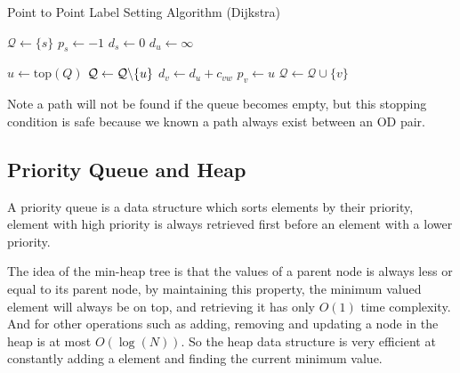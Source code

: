 \begin{algorithm}
    \caption{Point to Point Label Setting Algorithm (Dijkstra)}
    \label{algo:p2pdijkstra}
    \begin{algorithmic}[1]
        \State $\mathcal{Q} \gets \{s\}$ 
        \State $p_s \gets -1$
        \State $d_s \gets 0$
         
        \State $d_u \gets \infty$
    \EndFor

    \State $ u \gets \text{top}(Q) $
    \State $ \mathcal{Q} \gets \mathcal{Q} \char`\\ \{u\} $
    \State {}
\EndIf
{}
 
\State $d_v \gets d_u + c_{vw}$
\State $p_v \gets u$
\State $\mathcal{Q} \gets \mathcal{Q} \cup \{v\}$
                    \EndIf
                \EndFor
            \EndIf
        \EndWhile
    \EndProcedure
\end{algorithmic}
\end{algorithm}
Note a path will not be found if the queue becomes empty,
but this stopping condition is safe because we known a path
always exist between an OD pair.

\subsection{Priority Queue and Heap}
A priority queue is a data structure which sorts elements by their priority,
element with high priority is always retrieved first before an element with a lower priority.
\begin{comment}
In section~\ref{section:labelsettingalgorithm} and on wards,
a specific implementation of the priority queue is used:
min-heap tree (of which also have different types of implementation).
\end{comment}
The idea of the min-heap tree is that the values of a parent node
is always less or equal to its parent node,
by maintaining this property,
the minimum valued element will always be on top,
and retrieving it has only $O(1)$ time complexity.
And for other operations such as adding, removing and updating a node in the heap is at most $O(\log(N))$.
So the heap data structure is very efficient at constantly adding a element and finding the current minimum value.


